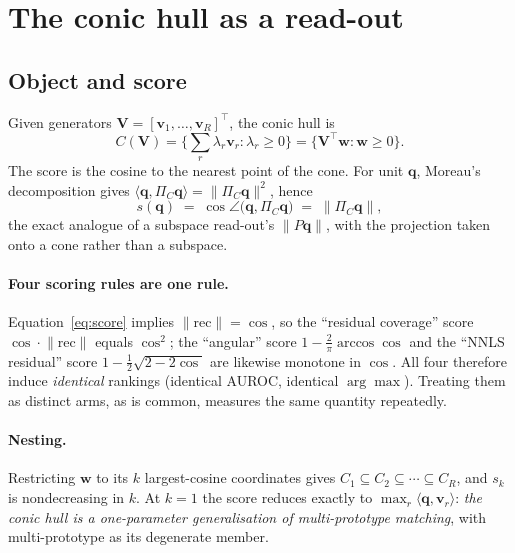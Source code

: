 \documentclass[10pt,twocolumn]{article}
\newcommand{\bq}{\mathbf{q}}
\newcommand{\bv}{\mathbf{v}}
\newcommand{\bw}{\mathbf{w}}
\newcommand{\bV}{\mathbf{V}}
\begin{document}
\section{The conic hull as a read-out}

\subsection{Object and score}
Given generators $\bV=[\bv_1,\dots,\bv_R]^{\!\top}$, the conic hull is
\begin{equation}
C(\bV) = \Big\{\textstyle\sum_r \lambda_r \bv_r : \lambda_r \ge 0\Big\}
       = \{\bV^{\!\top}\bw : \bw \ge 0\}.
\end{equation}
The score is the cosine to the nearest point of the cone. For unit $\bq$,
Moreau's decomposition gives $\langle \bq, \Pi_C\bq\rangle = \lVert\Pi_C\bq\rVert^2$,
hence
\begin{equation}
s(\bq) \;=\; \cos\angle\!\big(\bq,\Pi_C\bq\big) \;=\; \lVert \Pi_C \bq \rVert ,
\label{eq:score}
\end{equation}
the exact analogue of a subspace read-out's $\lVert P\bq\rVert$, with the
projection taken onto a cone rather than a subspace.

\paragraph{Four scoring rules are one rule.}
Equation~\eqref{eq:score} implies $\lVert\text{rec}\rVert = \cos$, so the
``residual coverage'' score $\cos\cdot\lVert\text{rec}\rVert$ equals $\cos^2$;
the ``angular'' score $1-\tfrac{2}{\pi}\arccos\cos$ and the ``NNLS residual''
score $1-\tfrac12\sqrt{2-2\cos}$ are likewise monotone in $\cos$. All four
therefore induce \emph{identical} rankings (identical AUROC, identical
$\arg\max$). Treating them as distinct arms, as is common, measures the same
quantity repeatedly.

\paragraph{Nesting.} Restricting $\bw$ to its $k$ largest-cosine coordinates gives
$C_1\subseteq C_2\subseteq\cdots\subseteq C_R$, and $s_k$ is nondecreasing in $k$.
At $k{=}1$ the score reduces exactly to $\max_r\langle\bq,\bv_r\rangle$: \emph{the
conic hull is a one-parameter generalisation of multi-prototype matching}, with
multi-prototype as its degenerate member.
\end{document}
